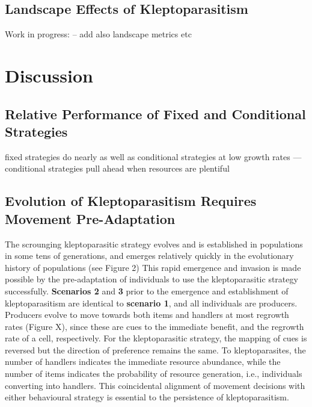 \documentclass[11pt]{article}
\begin{document}
\subsection{Landscape Effects of Kleptoparasitism}

Work in progress: -- add also landscape metrics etc


\section{Discussion}

\subsection{Relative Performance of Fixed and Conditional Strategies}

fixed strategies do nearly as well as conditional strategies at low growth rates --- conditional strategies pull ahead when resources are plentiful

\subsection{Evolution of Kleptoparasitism Requires Movement Pre-Adaptation}

The scrounging kleptoparasitic strategy evolves and is established in populations in some tens of generations, and emerges relatively quickly in the evolutionary history of populations (see Figure 2)
This rapid emergence and invasion is made possible by the pre-adaptation of individuals to use the kleptoparasitic strategy successfully.
\textbf{Scenarios 2} and \textbf{3} prior to the emergence and establishment of kleptoparasitism are identical to \textbf{scenario 1}, and all individuals are producers.
Producers evolve to move towards both items and handlers at most regrowth rates (Figure X), since these are cues to the immediate benefit, and the regrowth rate of a cell, respectively.
For the kleptoparasitic strategy, the mapping of cues is reversed but the direction of preference remains the same.
To kleptoparasites, the number of handlers indicates the immediate resource abundance, while the number of items indicates the probability of resource generation, i.e., individuals converting into handlers.
This coincidental alignment of movement decisions with either behavioural strategy is essential to the persistence of kleptoparasitism.
\end{document}
